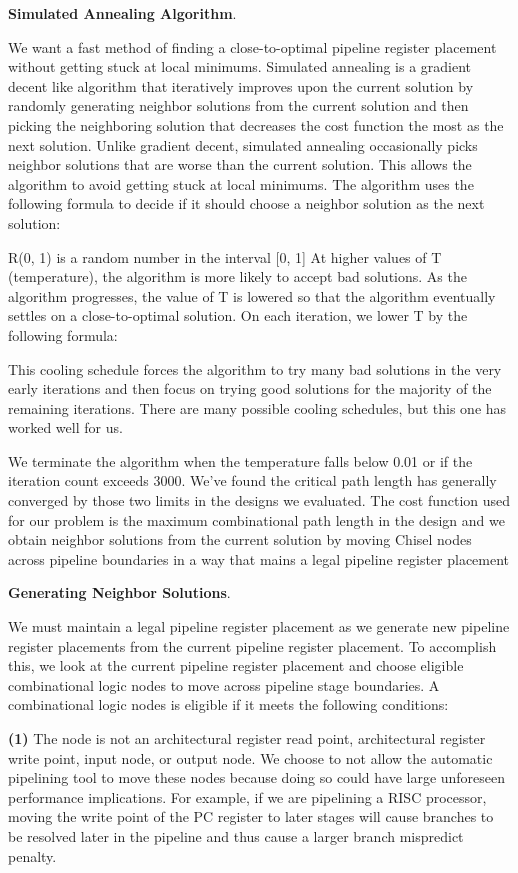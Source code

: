 {\bf Simulated Annealing Algorithm}.

We want a fast method of finding a close-to-optimal pipeline register placement without getting stuck at local minimums. Simulated annealing is a gradient decent like algorithm that iteratively improves upon the current solution by randomly generating neighbor solutions from the current solution and then picking the neighboring solution that decreases the cost function the most as the next solution. Unlike gradient decent, simulated annealing occasionally picks neighbor solutions that are worse than the current solution. This allows the algorithm to avoid getting stuck at local minimums. The algorithm uses the following formula to decide if it should choose a neighbor solution as the next solution:

R(0, 1) is a random number in the interval [0, 1]
At higher values of T (temperature), the algorithm is more likely to accept bad solutions. As the algorithm progresses, the value of T is lowered so that the algorithm eventually settles on a close-to-optimal solution. On each iteration, we lower T by the following formula:

This cooling schedule forces the algorithm to try many bad solutions in the very early iterations and then focus on trying good solutions for the majority of the remaining iterations. There are many possible cooling schedules, but this one has worked well for us.

We terminate the algorithm when the temperature falls below 0.01 or if the iteration count exceeds 3000. We’ve found the critical path length has generally converged by those two limits in the designs we evaluated.
The cost function used for our problem is the maximum combinational path length in the design and we obtain neighbor solutions from the current solution by moving Chisel nodes across pipeline boundaries in a way that mains a legal pipeline register placement

{\bf Generating Neighbor Solutions}.

We must maintain a legal pipeline register placement as we generate new pipeline register placements from the current pipeline register placement. To accomplish this, we look at the current pipeline register placement and choose eligible combinational logic nodes to move across pipeline stage boundaries. A combinational logic nodes is eligible if it meets the following conditions:

{\bf (1)} 
The node is not an architectural register read point, architectural register write point, input node, or output node. We choose to not allow the automatic pipelining tool to move these nodes because doing so could have large unforeseen performance implications. For example, if we are pipelining a RISC processor, moving the write point of the PC register to later stages will cause branches to be resolved later in the pipeline and thus cause a larger branch mispredict penalty.

